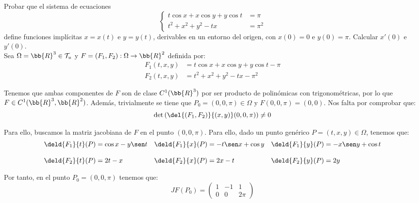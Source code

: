 \begin{ejercicio}
    Probar que el sistema de ecuaciones
    \begin{equation*}
        \left\{
            \begin{array}{ll}
                t\cos x + x\cos y + y\cos t &= \pi \\
                t^2 + x^2 + y^2 - tx &= \pi^2
            \end{array}
        \right.
    \end{equation*}
    define funciones implícitas $x=x(t)$ e $y=y(t)$, derivables en un entorno
    del origen, con $x(0)=0$ e $y(0)=\pi$. Calcular $x'(0)$ e $y'(0)$.\\

    Sea $\Omega = \bb{R}^3\in \mathcal{T}_u$ y $F=(F_1,F_2):\Omega \to \bb{R}^2$ definida por:
    \begin{align*}
        F_1(t,x,y) &= t\cos x + x\cos y + y\cos t-\pi \\
        F_2(t,x,y) &= t^2 + x^2 + y^2 - tx - \pi^2
    \end{align*}

    Tenemos que ambas componentes de $F$ son de clase $C^1(\bb{R}^3)$ por ser producto de polinómicas con trigonométricas,
    por lo que $F\in C^1(\bb{R}^3,\bb{R}^2)$. Además, trivialmente se tiene que $P_0=(0,0,\pi)\in \Omega$ y $F(0,0,\pi)=(0,0)$.
    Nos falta por comprobar que:
    \begin{equation*}
        \det \left( \del{(F_1,F_2)}{(x,y)}(0,0,\pi) \right) \neq 0
    \end{equation*}

    Para ello, buscamos la matriz jacobiana de $F$ en el punto $(0,0,\pi)$. Para ello, dado un punto genérico $P=(t,x,y)\in \Omega$, tenemos que:
    \begin{equation*}
        \begin{array}{llll}
            \deld{F_1}{t}(P) = \cos x - y\sen t & \deld{F_1}{x}(P) = -t\sen x +\cos y & \deld{F_1}{y}(P) = -x\sen y +\cos t \\ \\
            \deld{F_2}{t}(P) = 2t - x & \deld{F_2}{x}(P) = 2x - t & \deld{F_2}{y}(P) = 2y
        \end{array}
    \end{equation*}

    Por tanto, en el punto $P_0=(0,0,\pi)$ tenemos que:
    \begin{equation*}
        JF(P_0) = \left(
            \begin{array}{ccc}
                1 & -1 & 1 \\
                0 & 0 & 2\pi
            \end{array}
        \right)
    \end{equation*}


\end{ejercicio}
